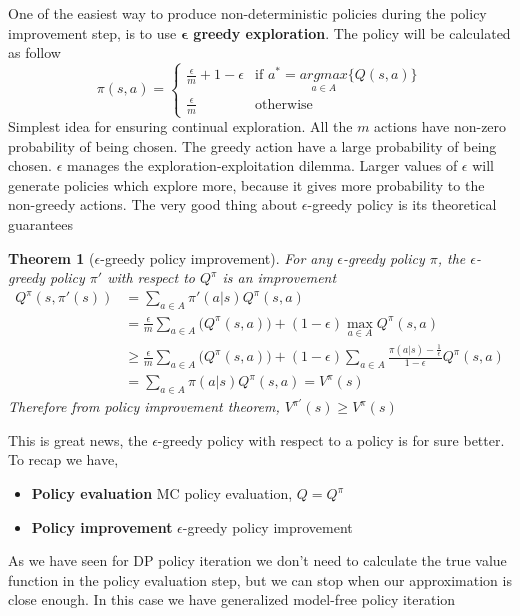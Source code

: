 \documentclass[main.tex]{subfiles}
\newtheorem{theorem}{Theorem}[section]
\begin{document}
\par
\noindent
One of the easiest way to produce non-deterministic policies during the policy improvement step, is to use \textbf{$\mathbf{\epsilon}$ greedy exploration}. The policy will be calculated as follow
\begin{equation}
    \pi(s,a) = 
    \begin{cases}
        \frac{\epsilon}{m}+1-\epsilon & \text{if }a^*=\underset{a \in A}{argmax} \{ Q(s,a) \} \\
        \frac{\epsilon}{m} & \text{otherwise}
    \end{cases}
\end{equation}
Simplest idea for ensuring continual exploration. All the $m$ actions have non-zero probability of being chosen. The greedy action have a large probability of being chosen. $\epsilon$ manages the exploration-exploitation dilemma. Larger values of $\epsilon$ will generate policies which explore more, because it gives more probability to the non-greedy actions. The very good thing about $\epsilon$-greedy policy is its theoretical guarantees
\begin{theorem}[$\epsilon$-greedy policy improvement]
For any $\epsilon$-greedy policy $\pi$, the $\epsilon$-greedy policy $\pi'$ with respect to $Q^{\pi}$ is an improvement
\begin{align*}
    Q^{\pi}(s,\pi'(s)) &= \sum_{a \in A} \pi'(a|s) Q^{\pi}(s,a) \\
    &= \frac{\epsilon}{m} \sum_{a \in A} \big( Q^{\pi}(s,a) \big) + (1-\epsilon) \max_{a \in A} Q^{\pi}(s,a) \\
    &\geq \frac{\epsilon}{m} \sum_{a \in A} \big( Q^{\pi}(s,a) \big) + (1-\epsilon) \sum_{a \in A} \frac{\pi(a|s) - \frac{1}{\epsilon}}{1 - \epsilon} Q^{\pi}(s,a) \\
    &= \sum_{a \in A} \pi(a|s) Q^{\pi}(s,a) = V^{\pi}(s)
\end{align*}
Therefore from policy improvement theorem, $V^{\pi'}(s) \geq V^{\pi}(s)$
\end{theorem}
\par
\noindent
This is great news, the $\epsilon$-greedy policy with respect to a policy is for sure better.
To recap we have,
\begin{itemize}
    \item \textbf{Policy evaluation} MC policy evaluation, $Q=Q^{\pi}$
    \item \textbf{Policy improvement} $\epsilon$-greedy policy improvement
\end{itemize}
As we have seen for DP policy iteration we don't need to calculate the true value function in the policy evaluation step, but we can stop when our approximation is close enough. In this case we have generalized model-free policy iteration
\end{document}
